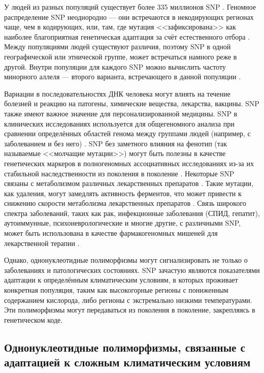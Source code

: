 У людей из разных популяций существует более 335 миллионов SNP \autocite{Auton2015}. Геномное распределение SNP неоднородно --- они встречаются в некодирующих регионах чаще, чем в кодирующих, или, там, где мутация <<зафиксирована>> как наиболее благоприятная генетическая адаптация за счёт естественного отбора \autocite{Barreiro2008}. Между популяциями людей существуют различия, поэтому SNP в одной географической или этнической группе, может встречаться намного реже в другой. Внутри популяции для каждого SNP можно вычислить частоту минорного аллеля --- второго варианта, встречающего в данной популяции \autocite{Zhu2015enrichment}. 

Вариации в последовательностях ДНК человека могут влиять на течение болезней и реакцию на патогены, химические вещества, лекарства, вакцины. SNP также имеют важное значение для персонализированной медицины. SNP в клинических исследованиях используется для общегеномного анализа при сравнении определённых областей генома между группами людей (например, с заболеванием и без него) \autocite{Yu2019}. SNP без заметного влияния на фенотип (так называемые <<молчащие мутации>>) могут быть полезны в качестве генетических маркеров в полногеномных ассоциативных исследованиях из-за их стабильной наследственности из поколения в поколение \autocite{Thomas2011}. Некоторые SNP связаны с метаболизмом различных лекарственных препаратов \autocite{Goldstein2001, Yanase2006}. Такие мутации, как удаления, могут замедлять активность ферментов, что может привести к снижению скорости метаболизма лекарственных препаратов \autocite{Butler2018}. Связь широкого спектра заболеваний, таких как рак, инфекционные заболевания (СПИД, гепатит), аутоиммунные, психоневрологические и многие другие, с различными SNP, может быть использована в качестве фармакогеномных мишеней для лекарственной терапии \autocite{Fareed2013}. 

Однако, однонуклеотидные полиморфизмы могут сигнализировать не только о заболеваниях и патологических состояниях. SNP зачастую являются показателями адаптации к определённым климатическим условиям, в которых проживает конкретная популяция, таким как высокогорные регионы с пониженным содержанием кислорода, либо регионы с экстремально низкими температурами. Эти полиморфизмы могут передаваться из поколения в поколение, закрепляясь в генетическом коде.

\subsection{Однонуклеотидные полиморфизмы, связанные с адаптацией к сложным климатическим условиям}\label{subsec:ch1/sec1/subsec6}

